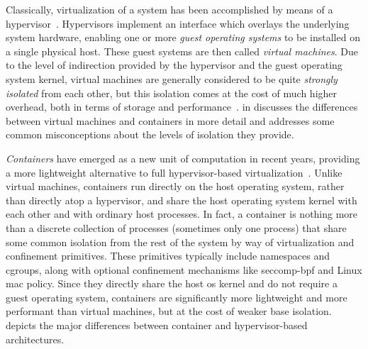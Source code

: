 \documentclass[
  fontsize=12pt,
  titlepage=firstiscover,
  paper=letter,
oneside,
  cleardoublepage=plain,
  parskip=half-,
  DIV=10,
  parindent,
  appendixprefix,
  chapterprefix,
  listof=totoc,
]{scrbook}
\begin{document}
Classically, virtualization of a system has been accomplished by means of
a hypervisor~\cite{eder2016_hypervisor_container, sultan2019_container_security}.
Hypervisors implement an interface which overlays the underlying system hardware,
enabling one or more \textit{guest operating systems} to be installed on a single physical
host. These guest systems are then called \textit{virtual machines}. Due to the level of
indirection provided by the hypervisor and the guest operating system kernel, virtual
machines are generally considered to be quite \textit{strongly isolated} from each other,
but this isolation comes at the cost of much higher overhead, both in terms of storage and
performance~\cite{eder2016_hypervisor_container, sultan2019_container_security}.
 in  discusses the differences between
virtual machines and containers in more detail and addresses some common misconceptions
about the levels of isolation they provide.





\textit{Containers} have emerged as a new unit of computation in recent years, providing
a more lightweight alternative to full hypervisor-based
virtualization~\cite{sultan2019_container_security, eder2016_hypervisor_container}.
Unlike virtual machines, containers run directly on the host operating system, rather than
directly atop a hypervisor, and share the host operating system kernel with each other and
with ordinary host processes. In fact, a container is nothing more than a discrete
collection of processes (sometimes only one process) that share some common isolation from
the rest of the system by way of virtualization and confinement primitives. These
primitives typically include namespaces and cgroups, along with optional confinement
mechanisms like seccomp-\gls{bpf} and Linux \gls{mac} policy. Since they directly share
the host \gls{os} kernel and do not require a guest operating system, containers are
significantly more lightweight and more performant than virtual machines, but at the cost of
weaker base isolation.  depicts the major differences between container and
hypervisor-based architectures.
\end{document}

